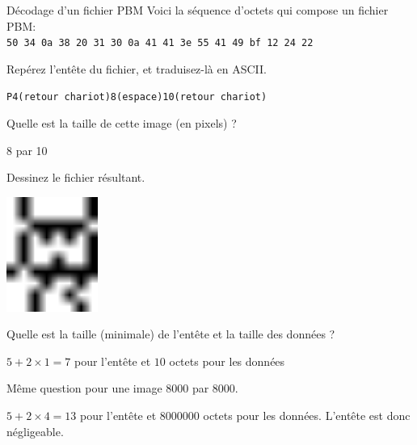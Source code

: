 \begin{exercice}
  \begin{exercicelet}{Décodage d'un fichier PBM}
    Voici la séquence d'octets qui compose un fichier PBM:\\
    \texttt{50 34 0a 38 20 31 30 0a 41 41 3e 55 41 49 bf 12 24 22}
    \begin{questions}
    \item Repérez l'entête du fichier, et traduisez-là en ASCII.
      \begin{correction}
        \texttt{P4(retour chariot)8(espace)10(retour chariot)}
      \end{correction}
    \item Quelle est la taille de cette image (en pixels) ?
      \begin{correction}
        8 par 10
      \end{correction}
    \item Dessinez le fichier résultant.
      \begin{correction}
        \includegraphics[width=3cm]{img/06/alien.png}
      \end{correction}
    \item Quelle est la taille (minimale) de l'entête et la taille des données
      ?
      \begin{correction}
        $5+2\times 1=7$ pour l'entête et $10$ octets pour les données
      \end{correction}
    \item Même question pour une image 8000 par 8000.
      \begin{correction}
        $5+2\times 4=13$ pour l'entête et $8000000$ octets pour les
        données. L'entête est donc négligeable.
      \end{correction}
    \end{questions}
  \end{exercicelet}
\end{exercice}
